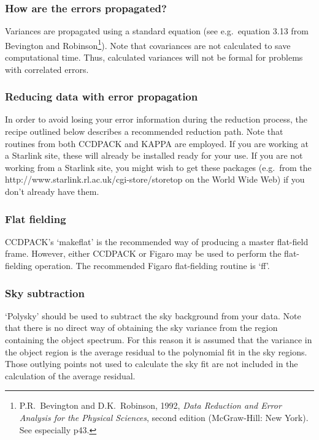 \subsubsection{How are the errors propagated?}

Variances are propagated using a standard equation (see e.g.\ equation 3.13
from Bevington and Robinson\footnote{P.R.~Bevington and D.K.~Robinson,
1992, {\it Data Reduction and Error Analysis for the Physical Sciences},
second edition (McGraw-Hill: New York).  See especially p43.}).
Note that covariances are not calculated to save computational time.  Thus,
calculated variances will not be formal for problems with correlated errors.

\subsubsection{Reducing data with error propagation}

In order to avoid losing your error information during the reduction
process, the recipe outlined below describes a recommended reduction
path. Note that routines from both CCDPACK and KAPPA are employed. If you
are working at a Starlink site, these will already be installed ready for
your use.  If you are not working from a Starlink site, you might wish to
get these packages (e.g.\ from the
{http://www.starlink.rl.ac.uk/cgi-store/storetop}
on the World Wide Web) if you don't already have them.

\subsubsection{Flat fielding}

CCDPACK's `makeflat' is the recommended way of producing a master 
flat-field frame. 
However, either CCDPACK or Figaro may be used to perform the
flat-fielding operation. 
The recommended Figaro flat-fielding routine is `ff'.

\subsubsection{Sky subtraction}

`Polysky' should be used to subtract the sky background from your data. Note
that there is no direct way of obtaining the sky variance from the region
containing the object spectrum. For this reason it is assumed that the
variance in the object region is the average residual to the polynomial
fit in the sky regions. Those outlying points not used to calculate the
sky fit are not included in the calculation of the average residual.

